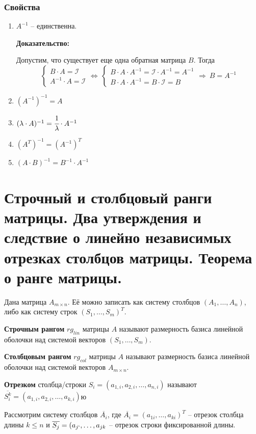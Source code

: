 \documentclass{article}
\newenvironment{comment}{}{}
\begin{document}
\subsubsection{Свойства}
\begin{enumerate}
    \item $A^{-1}$ -- единственна.
    
    \textbf{Доказательство:}
    
    Допустим, что существует еще одна обратная матрица $B$. Тогда
    $$\begin{cases} B\cdot A = \mathcal{I} \\ A^{-1}\cdot A = \mathcal{I} \end{cases}\Leftrightarrow\, \begin{cases} B\cdot A \cdot A^{-1} = \mathcal{I}\cdot A^{-1}=A^{-1} \\ B\cdot A\cdot A^{-1}=B\cdot \mathcal{I} = B \end{cases} \Rightarrow\: B=A^{-1}$$
    
    \item $(A^{-1})^{-1}=A$
    \item $(\lambda\cdot A)^{-1} = \cfrac{1}{\lambda}\cdot A^{-1}$
    \item $(A^T)^{-1}=(A^{-1})^T$
    \item $(A\cdot B)^{-1}=B^{-1}\cdot A^{-1}$
\end{enumerate}
\newpage
\section{Строчный и столбцовый ранги матрицы. Два утверждения и следствие о линейно независимых отрезках столбцов матрицы. Теорема о ранге матрицы.}

Дана матрица $A_{m\times n}$. Её можно записать как систему столбцов $(A_1,\ldots,A_n)$, либо как систему строк $(S_1,\ldots,S_m)^T$.

\textbf{Строчным рангом} $rg_{lin}$ матрицы $A$ называют размерность базиса линейной оболочки над системой векторов $(S_1,\ldots,S_m)$.

\textbf{Столбцовым рангом} $rg_{col}$ матрицы $A$ называют размерность базиса линейной оболочки над системой векторов $A_{m\times n}$.

\textbf{Отрезком} столбца/строки $S_i = (a_{1, i}, a_{2, i}, \ldots, a_{n, i})$ называют $\overline{S^k_i} = (a_{1, i}, a_{2, i}, \ldots, a_{k, i})$ю

\begin{comment}
	Рассмотрим систему столбцов $\overline{A_i}$, где $\overline{A_i}=(a_{1i},\ldots,a_{ki})^T$ -- отрезок столбца длины $k\leqslant n$ и $\overline{S_j}=(a_{j`},\ldots,a_{jk}$ -- отрезок строки фиксированной длины.
\end{comment}
\end{document}

